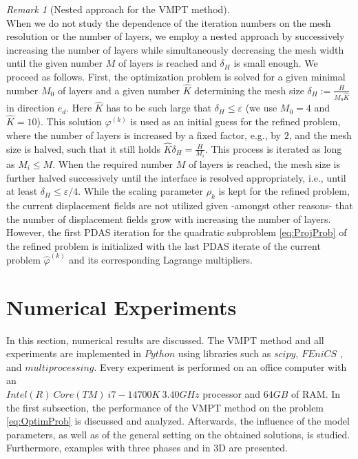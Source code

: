 \documentclass[a4paper,11pt]{article}
\theoremstyle{remark}
\newtheorem{remark}{Remark}%
\begin{document}
\begin{remark}[Nested approach for the VMPT method]
\label{sec:nesting} {\rm \hfill \\
When we do not study the dependence of the iteration numbers on the mesh resolution or the number of layers, we employ a nested approach by successively increasing the number of layers while simultaneously decreasing the mesh width until the given number $M$ of layers is reached and $\delta_H$ is small enough. 
We proceed as follows.
First, the optimization problem is solved for a given minimal number $M_0$ of layers and a given number
$\hat K$ determining the mesh size
$\delta_H:= \tfrac{H}{M_0 \hat K}$ in direction $e_d$.
  Here $\hat K$ has to be such large that $\delta_H \leq \varepsilon$
  (we use $M_0=4$ and $\hat K=10$).
This solution $\varphi^{(k)}$
is used as an initial guess for the refined problem, where the number of layers is increased by a fixed factor, e.g., by $2$, and the mesh size is halved, such that it still holds $\hat K \delta_H=\tfrac{H}{M_i}$. 
This process is iterated as long as $M_i\leq M$.
When the required number $M$ of layers is reached, the mesh size is further halved successively until the interface is resolved appropriately, i.e., until at least $\delta_H\leq \varepsilon /4 $.
%
While the scaling parameter
  $\rho_k$
  is kept for the refined problem,
  the current displacement fields are not utilized
  given -amongst other reasons- that
  the number of displacement fields grow
  with increasing the number of layers.
  However,
  the first PDAS iteration for the quadratic subproblem
  \eqref{eq:ProjProb} of the refined problem
  is initialized with the last PDAS iterate
  of the current problem $\hat \varphi^{(k)}$ and
  its corresponding Lagrange multipliers.
}
\end{remark}

\section{Numerical Experiments}
\label{sec:NumExp}
In this section, numerical results are discussed. The VMPT method and all experiments are implemented in $Python$ using libraries such as $scipy$, $FEniCS$ \cite{Fenics}, and $multiprocessing$. Every experiment is performed on an office computer with an \\ $Intel(R)\ Core(TM)\ i7-14700K\ 3.40 GHz$ processor and $64 GB$ of RAM.
In the first subsection, the performance of the VMPT method on the problem \eqref{eq:OptimProb} is discussed and analyzed.
Afterwards, the influence of the model parameters, as well as of the general setting on the obtained solutions, is studied. Furthermore, examples with three phases and in 3D are presented.
\end{document}
